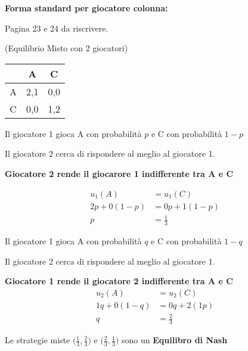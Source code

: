 \textbf{Forma standard per giocatore colonna:}

Pagina 23 e 24 da riscrivere.

\begin{esempio}(Equilibrio Misto con 2 giocatori)
\end{esempio}

\begin{table}[h]
    \begin{center}
        \begin{tabular}{|c|c|c|}
            \hline
              & A   & C   \\
            \hline
            A & 2,1 & 0,0 \\
            \hline
            C & 0,0 & 1,2 \\
            \hline
        \end{tabular}
    \end{center}
\end{table}

Il giocatore 1 gioca A con probabilità $p$ e C con probabilità $1-p$

Il giocatore 2 cerca di rispondere al meglio al giocatore 1.

\textbf{Giocatore 2 rende il giocarore 1 indifferente tra A e C}

\begin{equation}
    \begin{aligned}
        u_1(A)      & = u_1(C)      \\
        2p + 0(1-p) & = 0p + 1(1-p) \\
        p           & = \frac{1}{3}
    \end{aligned}
\end{equation}

Il giocatore 1 gioca A con probabilità $q$ e C con probabilità $1-q$

Il giocatore 2 cerca di rispondere al meglio al giocatore 1.

\textbf{Giocatore 1 rende il giocatore 2 indifferente tra A e C}
\begin{equation}
    \begin{aligned}
        u_2(A)      & = u_2(C)      \\
        1q + 0(1-q) & = 0q + 2(1p) \\
        q           & = \frac{2}{3}
    \end{aligned}
\end{equation}

Le strategie miste $\bigl(\frac{1}{3}, \frac{2}{3}\bigr)$ e $\bigl(\frac{2}{3},
    \frac{1}{3}\bigr)$ sono un \textbf{Equilibro di Nash}

